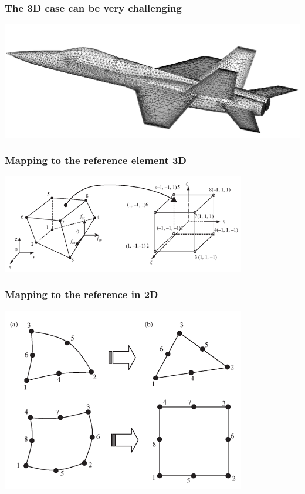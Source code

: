 \documentclass[handout]{beamer}
{
\usepackage{fullpage}
\usepackage{hyperref}
\usepackage{amssymb} 
}
\begin{document}
\begin{frame}
\frametitle{The 3D case can be very challenging}
\includegraphics[width=\textwidth]{F17.png}
\end{frame}

\begin{frame}
\frametitle{Mapping to the reference element 3D}
\includegraphics[width=0.8\textwidth]{FEmappingHex.png}
\end{frame}



\begin{frame}
\frametitle{Mapping to the reference in 2D}
\includegraphics[width=0.8\textwidth]{FEmapping2D.png}
\end{frame}
\end{document}
